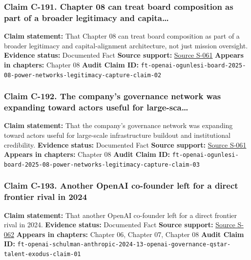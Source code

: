 \documentclass[
  american,
  11pt,
  letterpaper,
]{article}
\begin{document}
\subsubsection{Claim C-191. Chapter 08 can treat board composition as
part of a broader legitimacy and
capita\ldots{}}\label{claim-c-191-chapter-08-can-treat-board-composition-as-part-of-a-broader-legitimacy-and-capita}

\textbf{Claim statement:} That Chapter 08 can treat board composition as
part of a broader legitimacy and capital-alignment architecture, not
just mission oversight. \textbf{Evidence status:} Documented Fact
\textbf{Source support:}
\hyperref[source-s-061-openai-appoints-one-of-wall-street-s-most-powerful-dealmakers-to-its-board]{Source
S-061} \textbf{Appears in chapters:} Chapter 08 \textbf{Audit Claim ID:}
\texttt{ft-openai-ogunlesi-board-2025-08-power-networks-legitimacy-capture-claim-02}

\subsubsection{Claim C-192. The company's governance network was
expanding toward actors useful for
large-sca\ldots{}}\label{claim-c-192-the-company-s-governance-network-was-expanding-toward-actors-useful-for-large-sca}

\textbf{Claim statement:} That the company's governance network was
expanding toward actors useful for large-scale infrastructure buildout
and institutional credibility. \textbf{Evidence status:} Documented Fact
\textbf{Source support:}
\hyperref[source-s-061-openai-appoints-one-of-wall-street-s-most-powerful-dealmakers-to-its-board]{Source
S-061} \textbf{Appears in chapters:} Chapter 08 \textbf{Audit Claim ID:}
\texttt{ft-openai-ogunlesi-board-2025-08-power-networks-legitimacy-capture-claim-03}

\subsubsection{Claim C-193. Another OpenAI co-founder left for a direct
frontier rival in
2024}\label{claim-c-193-another-openai-co-founder-left-for-a-direct-frontier-rival-in-2024}

\textbf{Claim statement:} That another OpenAI co-founder left for a
direct frontier rival in 2024. \textbf{Evidence status:} Documented Fact
\textbf{Source support:}
\hyperref[source-s-062-openai-co-founder-departs-for-rival-anthropic]{Source
S-062} \textbf{Appears in chapters:} Chapter 06, Chapter 07, Chapter 08
\textbf{Audit Claim ID:}
\texttt{ft-openai-schulman-anthropic-2024-13-openai-governance-qstar-talent-exodus-claim-01}
\end{document}
